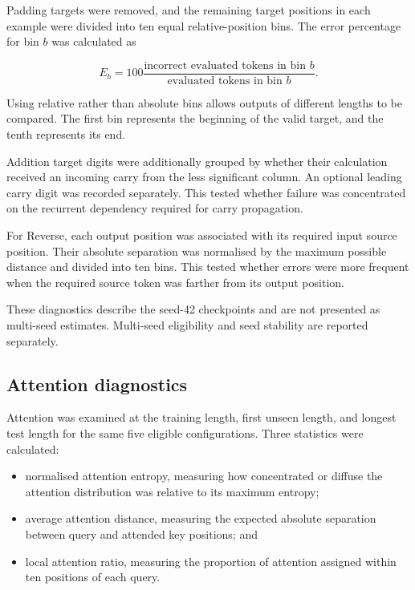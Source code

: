 \documentclass[
    author={Aanchala Ravindra Bhongade},
    supervisor={Dr. Fernando Moreno-Pino},
    degree={MSc},
    title={Length Generalisation in Transformer-Based Sequence Models: Failure Taxonomy and Mitigation Strategies},
    subtitle={},
    type={},
    year={2026}
]{dissertation}
\begin{document}
Padding targets were removed, and the remaining target positions in each example were divided into ten equal relative-position bins. The error percentage for bin \(b\) was calculated as

\begin{equation}
E_b
=
100
\frac{\text{incorrect evaluated tokens in bin }b}
{\text{evaluated tokens in bin }b}.
\label{eq:position-bin-error}
\end{equation}

Using relative rather than absolute bins allows outputs of different lengths to be compared. The first bin represents the beginning of the valid target, and the tenth represents its end.

Addition target digits were additionally grouped by whether their calculation received an incoming carry from the less significant column. An optional leading carry digit was recorded separately. This tested whether failure was concentrated on the recurrent dependency required for carry propagation.

For Reverse, each output position was associated with its required input source position. Their absolute separation was normalised by the maximum possible distance and divided into ten bins. This tested whether errors were more frequent when the required source token was farther from its output position.

These diagnostics describe the seed-42 checkpoints and are not presented as multi-seed estimates. Multi-seed eligibility and seed stability are reported separately.

\subsection{Attention diagnostics}
\label{sec:attention-diagnostics}

Attention was examined at the training length, first unseen length, and longest test length for the same five eligible configurations. Three statistics were calculated:

\begin{itemize}
    \item normalised attention entropy, measuring how concentrated or diffuse the attention distribution was relative to its maximum entropy;

    \item average attention distance, measuring the expected absolute separation between query and attended key positions; and

    \item local attention ratio, measuring the proportion of attention assigned within ten positions of each query.
\end{itemize}
\end{document}
